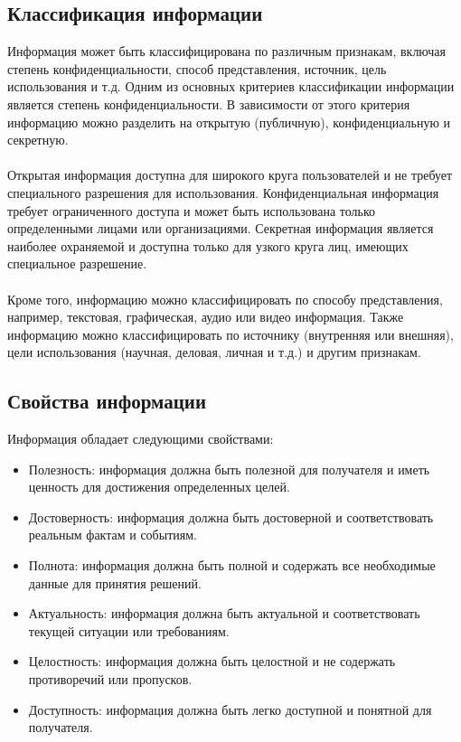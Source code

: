 \documentclass{article}
\begin{document}
\subsection{Классификация информации}
Информация может быть классифицирована по различным признакам, включая степень конфиденциальности, способ представления, источник, цель использования и т.д. Одним из основных критериев классификации информации является степень конфиденциальности. В зависимости от этого критерия информацию можно разделить на открытую (публичную), конфиденциальную и секретную.\\
~\\
Открытая информация доступна для широкого круга пользователей и не требует специального разрешения для использования. Конфиденциальная информация требует ограниченного доступа и может быть использована только определенными лицами или организациями. Секретная информация является наиболее охраняемой и доступна только для узкого круга лиц, имеющих специальное разрешение.\\
~\\
Кроме того, информацию можно классифицировать по способу представления, например, текстовая, графическая, аудио или видео информация. Также информацию можно классифицировать по источнику (внутренняя или внешняя), цели использования (научная, деловая, личная и т.д.) и другим признакам.
\subsection{Свойства информации}
Информация обладает следующими свойствами:
\begin{itemize}
\item Полезность: информация должна быть полезной для получателя и иметь ценность для достижения определенных целей.
\item Достоверность: информация должна быть достоверной и соответствовать реальным фактам и событиям.
\item Полнота: информация должна быть полной и содержать все необходимые данные для принятия решений.
\item Актуальность: информация должна быть актуальной и соответствовать текущей ситуации или требованиям.
\item Целостность: информация должна быть целостной и не содержать противоречий или пропусков.
\item Доступность: информация должна быть легко доступной и понятной для получателя.
\end{itemize}
\end{document}
